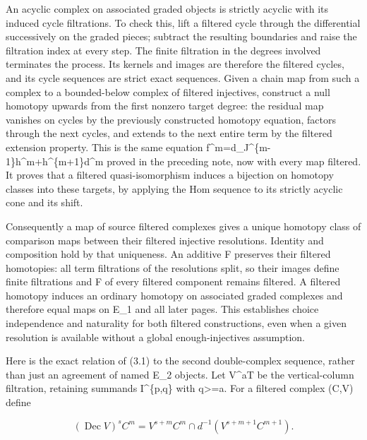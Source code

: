 \documentclass[11pt]{article}
\begin{document}
An acyclic complex on associated graded objects is strictly acyclic with its induced cycle filtrations. To check this,\allowbreak{} lift a filtered cycle through the differential successively on the graded pieces; subtract the resulting boundaries and raise the filtration index at every step. The finite filtration in the degrees involved terminates the process. Its kernels and images are therefore the filtered cycles,\allowbreak{} and its cycle sequences are strict exact sequences. Given a chain map from such a complex to a bounded-below complex of filtered injectives,\allowbreak{} construct a null homotopy upwards from the first nonzero target degree:\allowbreak{} the residual map vanishes on cycles by the previously constructed homotopy equation,\allowbreak{} factors through the next cycles,\allowbreak{} and extends to the next entire term by the filtered extension property. This is the same equation f\textasciicircum{}m\allowbreak{}=d\_\allowbreak{}J\textasciicircum{}\{m-1\}h\textasciicircum{}m\allowbreak{}+h\textasciicircum{}\{m\allowbreak{}+1\}d\textasciicircum{}m proved in the preceding note,\allowbreak{} now with every map filtered. It proves that a filtered quasi-isomorphism induces a bijection on homotopy classes into these targets,\allowbreak{} by applying the Hom sequence to its strictly acyclic cone and its shift.

Consequently a map of source filtered complexes gives a unique homotopy class of comparison maps between their filtered injective resolutions. Identity and composition hold by that uniqueness. An additive F preserves their filtered homotopies:\allowbreak{} all term filtrations of the resolutions split,\allowbreak{} so their images define finite filtrations and F of every filtered component remains filtered. A filtered homotopy induces an ordinary homotopy on associated graded complexes and therefore equal maps on E\_\allowbreak{}1 and all later pages. This establishes choice independence and naturality for both filtered constructions,\allowbreak{} even when a given resolution is available without a global enough-injectives assumption.

Here is the exact relation of (3.1)\allowbreak{} to the second double-complex sequence,\allowbreak{} rather than just an agreement of named E\_\allowbreak{}2 objects. Let V\^{}aT be the vertical-column filtration,\allowbreak{} retaining summands I\textasciicircum{}\{p,\allowbreak{}q\} with q>\allowbreak{}=a. For a filtered complex (C,\allowbreak{}V)\allowbreak{} define

\[
 (\operatorname{Dec}V)^s C^m
   =V^{s+m}C^m\cap d^{-1}(V^{s+m+1}C^{m+1}).                  \tag{3.2}
\]
\end{document}

